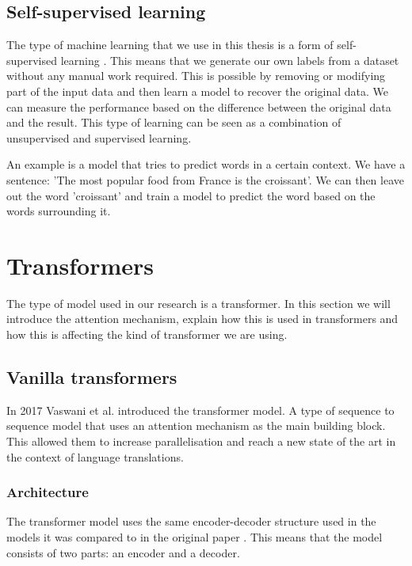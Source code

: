 \subsection{Self-supervised learning}

The type of machine learning that we use in this thesis is a form of self-supervised learning \cite{doersch_multi-task_2017}. This means that we generate our own labels from a dataset without any manual work required. This is possible by removing or modifying part of the input data and then learn a model to recover the original data. We can measure the performance based on the difference between the original data and the result. This type of learning can be seen as a combination of unsupervised and supervised learning.

An example is a model that tries to predict words in a certain context. We have a sentence: 'The most popular food from France is the croissant'. We can then leave out the word 'croissant' and train a model to predict the word based on the words surrounding it.

\section{Transformers}
\label{sec:prelim:transformers}

The type of model used in our research is a transformer. In this section we will introduce the attention mechanism, explain how this is used in transformers and how this is affecting the kind of transformer we are using.

\subsection{Vanilla transformers}
\label{sec:prelim:transformers:vanilla}

In 2017 Vaswani et al.\cite{vaswani_attention_2017} introduced the transformer model. A type of sequence to sequence model that uses an attention mechanism as the main building block. This allowed them to increase parallelisation and reach a new state of the art in the context of language translations.

\subsubsection{Architecture}

The transformer model uses the same encoder-decoder structure used in the models it was compared to in the original paper \cite{bahdanau_neural_2016, cho_learning_2014}. This means that the model consists of two parts: an encoder and a decoder.

